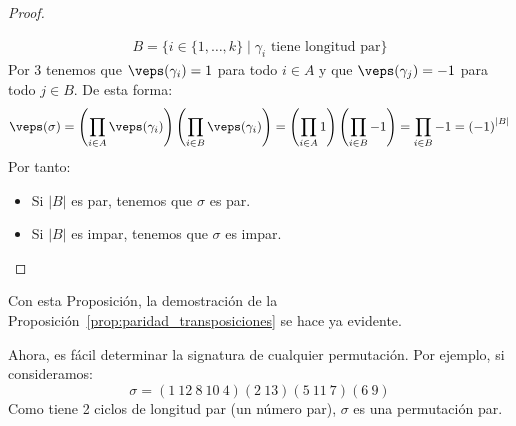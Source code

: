 \begin{prop}
\begin{proof}
\begin{enumerate}
\begin{gather*}
                    B = \{i \in \{1,\ldots,k\} \mid \gamma_i \text{\ tiene longitud par}\} 
                \end{gather*}
                Por 3 tenemos que $\veps(\gamma_i) = 1$ para todo $i \in A$ y que $\veps(\gamma_j) = -1$ para todo $j\in B$. De esta forma:
                \begin{equation*}
                    \veps(\sigma) = \left(\prod_{i \in A}\veps(\gamma_i)\right) \left(\prod_{i \in B}\veps(\gamma_i)\right) = \left(\prod_{i \in A}1\right) \left(\prod_{i \in B}-1\right) = \prod_{i \in B}-1 = {(-1)}^{|B|}
                \end{equation*}
                Por tanto:
                \begin{itemize}
                    \item Si $|B|$ es par, tenemos que $\sigma$ es par.
                    \item Si $|B|$ es impar, tenemos que $\sigma$ es impar.
                \end{itemize}
        \end{enumerate}
    \end{proof}
\end{prop}

\noindent
Con esta Proposición, la demostración de la Proposición~\ref{prop:paridad_transposiciones} se hace ya evidente.

\begin{ejemplo}
    Ahora, es fácil determinar la signatura de cualquier permutación. Por ejemplo, si consideramos:
    \begin{equation*}
        \sigma = (1\ 12\ 8\ 10\ 4)(2\ 13)(5\ 11\ 7)(6\ 9)
    \end{equation*}
    Como tiene 2 ciclos de longitud par (un número par), $\sigma$ es una permutación par.
\end{ejemplo}

